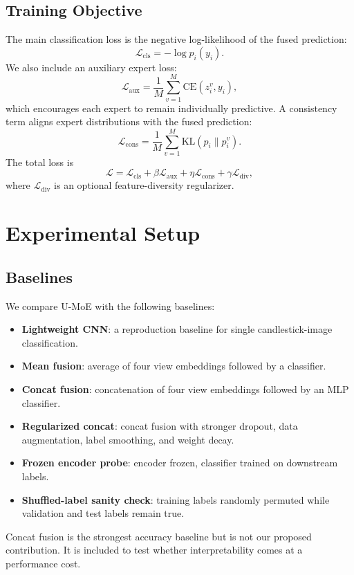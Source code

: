 ﻿\documentclass[conference]{IEEEtran}
\newcommand{\method}{U-MoE}
\begin{document}
\subsection{Training Objective}
The main classification loss is the negative log-likelihood of the fused prediction:
\begin{equation}
\mathcal{L}_{\mathrm{cls}} = -\log p_i(y_i).
\end{equation}
We also include an auxiliary expert loss:
\begin{equation}
\mathcal{L}_{\mathrm{aux}} = \frac{1}{M}\sum_{v=1}^{M}\mathrm{CE}(z_i^v,y_i),
\end{equation}
which encourages each expert to remain individually predictive. A consistency term aligns expert distributions with the fused prediction:
\begin{equation}
\mathcal{L}_{\mathrm{cons}} = \frac{1}{M}\sum_{v=1}^{M}\mathrm{KL}(p_i \parallel p_i^v).
\end{equation}
The total loss is
\begin{equation}
\mathcal{L} =
\mathcal{L}_{\mathrm{cls}}
+ \beta\mathcal{L}_{\mathrm{aux}}
+ \eta\mathcal{L}_{\mathrm{cons}}
+ \gamma\mathcal{L}_{\mathrm{div}},
\end{equation}
where $\mathcal{L}_{\mathrm{div}}$ is an optional feature-diversity regularizer.

\section{Experimental Setup}

\subsection{Baselines}
We compare \method{} with the following baselines:
\begin{itemize}
    \item \textbf{Lightweight CNN}: a reproduction baseline for single candlestick-image classification.
    \item \textbf{Mean fusion}: average of four view embeddings followed by a classifier.
    \item \textbf{Concat fusion}: concatenation of four view embeddings followed by an MLP classifier.
    \item \textbf{Regularized concat}: concat fusion with stronger dropout, data augmentation, label smoothing, and weight decay.
    \item \textbf{Frozen encoder probe}: encoder frozen, classifier trained on downstream labels.
    \item \textbf{Shuffled-label sanity check}: training labels randomly permuted while validation and test labels remain true.
\end{itemize}
Concat fusion is the strongest accuracy baseline but is not our proposed contribution. It is included to test whether interpretability comes at a performance cost.
\end{document}
